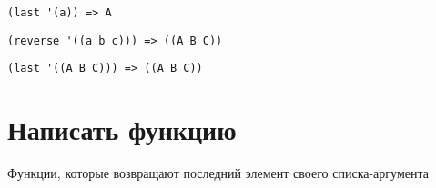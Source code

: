 \problem \hfill

\begin{lstlisting}
(last '(a)) => A
\end{lstlisting}


\problem \hfill

\begin{lstlisting}
(reverse '((a b c))) => ((A B C))
\end{lstlisting}


\problem \hfill

\begin{lstlisting}
(last '((A B C))) => ((A B C))
\end{lstlisting}



\section{Написать функцию}

\problem Функции, которые возвращают последний элемент своего списка-аргумента